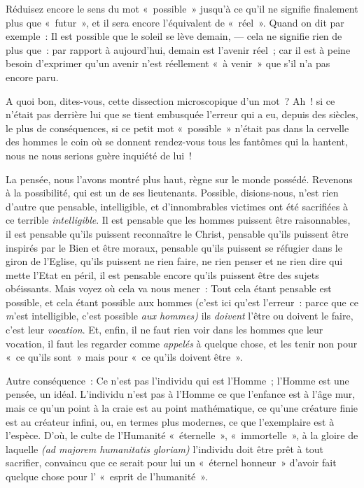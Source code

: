 \documentclass[french,twoside]{book} %
\begin{document}
Réduisez encore le sens du mot « possible » jusqu’à ce qu’il ne signifie finalement plus que « futur », et il sera encore l’équivalent de « réel ». Quand on dit par exemple : Il est possible que le soleil se lève demain,  — cela ne signifie rien de plus que : par rapport à aujourd’hui, demain est l’avenir réel ; car il est à peine besoin d’exprimer qu’un avenir n’est réellement « à venir » que s’il n’a pas encore paru.\par
A quoi bon, dites-vous, cette dissection microscopique d’un mot ? Ah ! si ce n’était pas derrière lui que se tient embusquée l’erreur qui a eu, depuis des siècles, le plus de conséquences, si ce petit mot « possible » n’était pas dans la cervelle des hommes le coin où se donnent rendez-vous tous les fantômes qui la hantent, nous ne nous serions guère inquiété de lui !\par
La pensée, nous l’avons montré plus haut, règne sur le monde possédé. Revenons à la possibilité, qui est un de ses lieutenants. Possible, disions-nous, n’est rien d’autre que pensable, intelligible, et d’innombrables victimes ont été sacrifiées à ce terrible \emph{intelligible}. Il est pensable que les hommes puissent être raisonnables, il est pensable qu’ils puissent reconnaître le Christ, pensable qu’ils puissent être inspirés par le Bien et être moraux, pensable qu’ils puissent se réfugier dans le giron de l’Eglise, qu’ils puissent ne rien faire, ne rien penser et ne rien dire qui mette l’Etat en péril, il est pensable encore qu’ils puissent être des sujets obéissants. Mais voyez où cela va nous mener : Tout cela étant pensable est possible, et cela étant possible aux hommes (c’est ici qu’est l’erreur : parce que ce \emph{m}’est intelligible, c’est possible \emph{aux hommes)} ils \emph{doivent} l’être ou doivent le faire, c’est leur \emph{vocation}. Et, enfin, il ne faut rien voir dans les hommes que leur vocation, il faut les regarder comme \emph{appelés} à quelque chose, et les tenir non pour « ce qu’ils sont » mais pour « ce qu’ils doivent être ».\par
Autre conséquence : Ce n’est pas l’individu qui est l’Homme ; l’Homme est une pensée, un idéal. L’individu n’est pas à l’Homme ce que l’enfance est à l’âge mur, mais ce qu’un point à la craie est au point mathématique,  ce qu’une créature finie est au créateur infini, ou, en termes plus modernes, ce que l’exemplaire est à l’espèce. D’où, le culte de l’Humanité « éternelle », « immortelle », à la gloire de laquelle \emph{(ad majorem humanitatis gloriam)} l’individu doit être prêt à tout sacrifier, convaincu que ce serait pour lui un « éternel honneur » d’avoir fait quelque chose pour l’ « esprit de l’humanité ».\par
\end{document}
